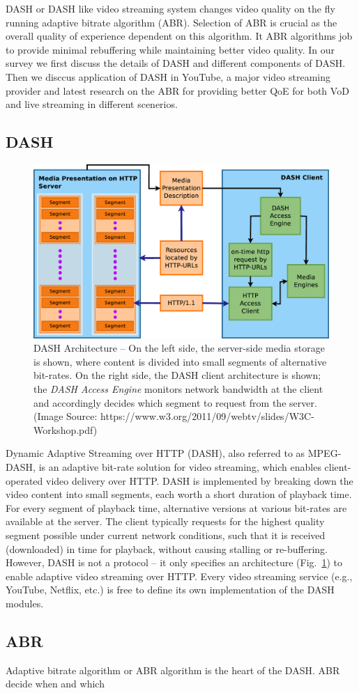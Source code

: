 DASH or DASH like video streaming system changes video quality on the fly running adaptive bitrate algorithm (ABR). Selection of ABR is crucial as the overall quality of experience dependent on this algorithm. It ABR algorithms job to provide minimal rebuffering while maintaining better video quality. In our survey we first discuss the details of DASH and different components of DASH. Then we disccus application of DASH in YouTube, a major video streaming provider and latest research on the ABR for providing better QoE for both VoD and live streaming in different scenerios.

\subsection{DASH}
\begin{figure}[!t]
	\centering
	\includegraphics[scale=0.15]{img/dash-arch}
	\caption{\small{DASH Architecture -- On the left side, the server-side media storage is shown, where content is divided into small segments of alternative bit-rates. On the right side, the DASH client architecture is shown; the {\it DASH Access Engine} monitors network bandwidth at the client and accordingly decides which segment to request from the server. (Image Source: https://www.w3.org/2011/09/webtv/slides/W3C-Workshop.pdf)}}
	\label{fig:dash}
\end{figure}
%
Dynamic Adaptive Streaming over HTTP (DASH), also referred to as MPEG-DASH, is an adaptive bit-rate solution for video streaming, which enables client-operated video delivery over HTTP.
%
DASH is implemented by breaking down the video content into small segments, each worth a short duration of playback time.
%
For every segment of playback time, alternative versions at various bit-rates are available at the server.
%
The client typically requests for the highest quality segment possible under current network conditions, such that it is received (downloaded) in time for playback, without causing stalling or re-buffering. 
%
However, DASH is not a protocol -- it only specifies an architecture (Fig.~\ref{fig:dash}) to enable adaptive video streaming over HTTP.
%
Every video streaming service (e.g., YouTube, Netflix, etc.) is free to define its own implementation of the DASH modules.

\subsection{ABR}
Adaptive bitrate algorithm or ABR algorithm is the heart of the DASH. ABR decide when and which
